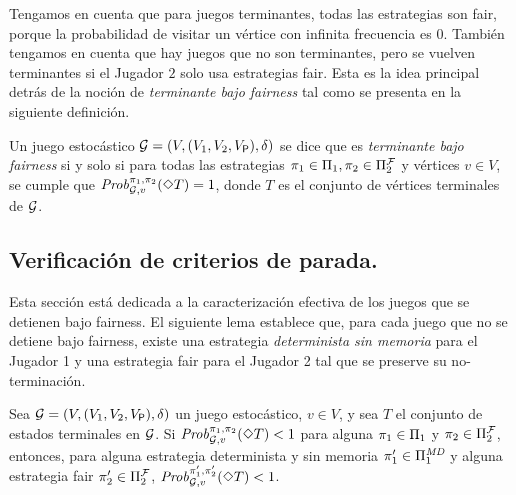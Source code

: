 Tengamos en cuenta que para juegos terminantes, todas las estrategias son fair, porque la probabilidad de visitar un vértice con infinita frecuencia es $0$.
%
También tengamos en cuenta que hay juegos que no son terminantes, pero se vuelven terminantes si el Jugador $2$ solo usa estrategias fair. Esta es la idea principal detrás de la noción de \emph{terminante bajo fairness} tal como se presenta en la siguiente definición.

	
\begin{definition}\label{def:stopping-under-fairness}
  Un juego estocástico $\mathcal{G} = (V, (V_1, V_2, V_{\mathsf{P}}), \delta)$ se dice que es \emph{terminante bajo fairness} si y solo si para todas las estrategias $\pi_{1} \in \Pi_{1}, \pi_{2} \in \Pi^{\mathcal{F}}_{2}$ y vértices $v \in V$, se cumple que
  $\mathit{Prob}^{\pi_{1}, \pi_{2}}_{\mathcal{G},v}(\Diamond T)=1$,  donde $T$ es el conjunto de vértices terminales de $\mathcal{G}$. 
\end{definition}


\subsection{Verificación de criterios de parada.}

Esta sección está dedicada a la
caracterización efectiva de los juegos que se detienen bajo fairness.
El siguiente lema establece que, para cada juego que no se detiene bajo
fairness, existe una estrategia \emph{determinista sin memoria} para el Jugador 1 y una estrategia fair para el Jugador 2 tal que se preserve su no-terminación.


\begin{lemma}\label{lm:memoryless-strat}
  Sea $\mathcal{G} = (V, (V_1, V_2, V_{\mathsf{P}}), \delta)$ un juego estocástico, $v \in V$, y sea $T$ el conjunto de estados terminales en $\mathcal{G}$.
  Si $\mathit{Prob}^{\pi_{1}, \pi_{2}}_{\mathcal{G}, v}(\Diamond T) < 1$
  para alguna
  $\pi_{1} \in \Pi_{1}$ y $\pi_{2} \in \Pi^{\mathcal{F}}_{2}$,
  entonces, para alguna estrategia determinista y sin memoria
  $\pi_{1}' \in \Pi^{\textit{MD}}_{1}$ y alguna estrategia fair
  $\pi_{2}' \in \Pi^{\mathcal{F}}_{2}$,
  $\mathit{Prob}^{\pi_{1}', \pi_{2}'}_{\mathcal{G}, v}(\Diamond T) < 1$.
\end{lemma}

